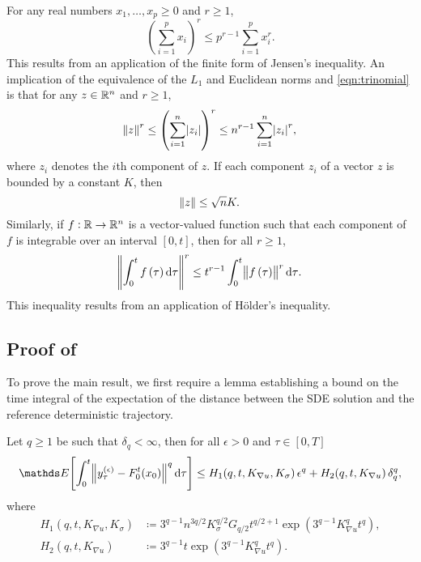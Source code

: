 For any real numbers \(x_1,\hdots,x_p \geq 0\) and \(r \geq 1\),
\begin{equation}
	\left(\sum_{i=1}^p{x_i}\right)^r \leq p^{r-1}\sum_{i=1}^p{x_i^r}.
	\label{eqn:trinomial}
\end{equation}
This results from an application of the finite form of Jensen's inequality.
An implication of the equivalence of the \(L_1\) and Euclidean norms and \cref{eqn:trinomial} is that for any \(z \in \mathbb{R}^n\) and \(r \geq 1\),
\begin{equation}
	\norm{z}^r \leq \left(\sum_{i = 1}^n{\abs{z_i}}\right)^r \leq n^{r-1}\sum_{i=1}^n{\abs{z_i}^r},
	\label{eqn:norm_trinomial}
\end{equation}
where \(z_i\) denotes the \(i\)th component of \(z\).
If each component \(z_i\) of a vector \(z\) is bounded by a constant \(K\), then
\begin{equation}\label{eqn:bound_vector}
	\norm{z} \leq \sqrt{n} K.
\end{equation}
Similarly, if \(f: \mathbb{R} \to \mathbb{R}^n\) is a vector-valued function such that each component of \(f\) is integrable over an interval \([0,t]\), then for all \(r \geq 1\),
\begin{equation}
	\norm{\int_0^t{f\left(\tau\right)\dif\tau}}^r \leq t^{r-1}\int_0^t{\norm{f\left(\tau\right)}^r\dif\tau}.
	\label{eqn:convex_integral}
\end{equation}
This inequality results from an application of H\"{o}lder's inequality.


\subsection{Proof of }\label{app:main_thm_proof}
To prove the main result, we first require a lemma establishing a bound on the time integral of the expectation of the distance between the SDE solution and the reference deterministic trajectory.

\begin{lemma}\label{lem:z_int_bound}
	Let \(q \geq 1\) be such that \(\delta_q < \infty\), then for all \(\epsilon > 0\) and \(\tau \in [0,T]\)
	\begin{equation*}
		\avg{\int_0^t{\norm{y_\tau^{(\epsilon)} - F_0^t\!\left(x_0\right)}^q\dif\tau}} \leq H_1\!\left(q,t, K_{\nabla u}, K_{\sigma}\right)\epsilon^q + H_2\!\left(q,t, K_{\nabla u}\right)\delta_q^q,
	\end{equation*}
	where
	\begin{align*}
		H_1\!\left(q,t, K_{\nabla u}, K_{\sigma}\right) & \coloneqq 3^{q-1} n^{3q/2} K_{\sigma}^{q/2} G_{q/2} t^{q/2 + 1}\exp\left(3^{q-1} K_{\nabla u}^q t^q\right), \\
		H_2\!\left(q,t, K_{\nabla u}\right)             & \coloneqq 3^{q-1} t \exp\left(3^{q-1} K_{\nabla u}^q t^q\right).
	\end{align*}
\end{lemma}

